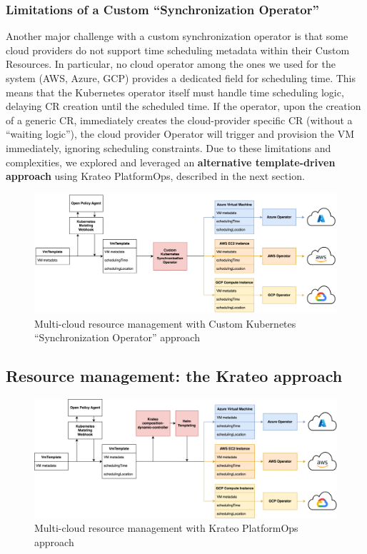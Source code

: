 \subsubsection{Limitations of a Custom ``Synchronization Operator''}
Another major challenge with a custom synchronization operator is that some cloud providers do not support time scheduling metadata within their Custom Resources. In particular, no cloud operator among the ones we used for the system (AWS, Azure, GCP) provides a dedicated field for scheduling time.
This means that the Kubernetes operator itself must handle time scheduling logic, delaying CR creation until the scheduled time.
If the operator, upon the creation of a generic CR, immediately creates the cloud-provider specific CR (without a ``waiting logic''), the cloud provider Operator will trigger and provision the VM immediately, ignoring scheduling constraints.
Due to these limitations and complexities, we explored and leveraged an \textbf{alternative template-driven approach} using Krateo PlatformOps, described in the next section.

\begin{figure}[htb]
  \centering
  \includegraphics[width=1\linewidth]{images/k8s_operator.png}
  \caption{Multi-cloud resource management with Custom Kubernetes ``Synchronization Operator'' approach}
  \label{fig:k8s_operator}
\end{figure}

\subsection{Resource management: the Krateo approach}

\begin{figure}[htb]
  \centering
  \includegraphics[width=1\linewidth]{images/krateo.png}
  \caption{Multi-cloud resource management with Krateo PlatformOps approach}
  \label{fig:krateo}
\end{figure}


